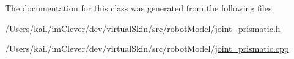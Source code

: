 The documentation for this class was generated from the following files:\begin{DoxyCompactItemize}
\item 
/Users/kail/imClever/dev/virtualSkin/src/robotModel/\hyperlink{joint__prismatic_8h}{joint\_\-prismatic.h}\item 
/Users/kail/imClever/dev/virtualSkin/src/robotModel/\hyperlink{joint__prismatic_8cpp}{joint\_\-prismatic.cpp}\end{DoxyCompactItemize}
